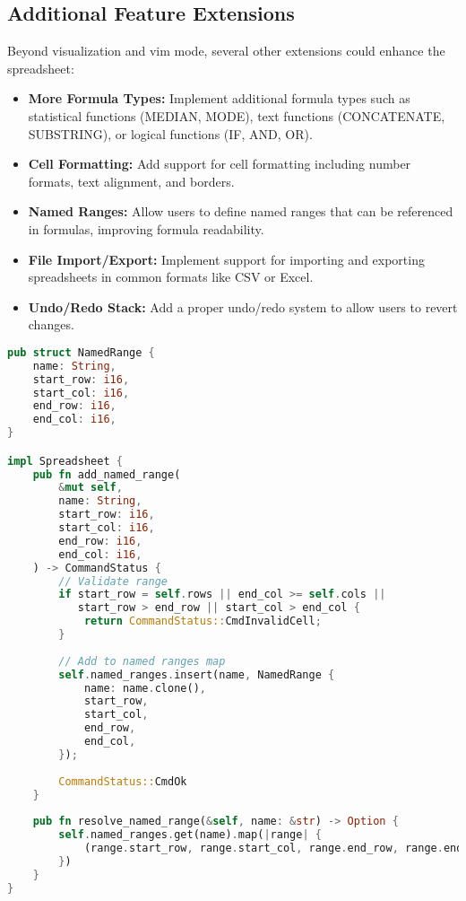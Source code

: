\documentclass[11pt,a4paper]{article}
\begin{document}
\subsection{Additional Feature Extensions}

Beyond visualization and vim mode, several other extensions could enhance the spreadsheet:

\begin{itemize}
  \item \textbf{More Formula Types:} Implement additional formula types such as statistical functions (MEDIAN, MODE), text functions (CONCATENATE, SUBSTRING), or logical functions (IF, AND, OR).
  
  \item \textbf{Cell Formatting:} Add support for cell formatting including number formats, text alignment, and borders.
  
  \item \textbf{Named Ranges:} Allow users to define named ranges that can be referenced in formulas, improving formula readability.
  
  \item \textbf{File Import/Export:} Implement support for importing and exporting spreadsheets in common formats like CSV or Excel.
  
  \item \textbf{Undo/Redo Stack:} Add a proper undo/redo system to allow users to revert changes.
\end{itemize}

\begin{lstlisting}[language=Rust, caption={Implementation of named ranges}, label=lst:named-ranges]
pub struct NamedRange {
    name: String,
    start_row: i16,
    start_col: i16,
    end_row: i16,
    end_col: i16,
}

impl Spreadsheet {
    pub fn add_named_range(
        &mut self,
        name: String,
        start_row: i16,
        start_col: i16,
        end_row: i16,
        end_col: i16,
    ) -> CommandStatus {
        // Validate range
        if start_row = self.rows || end_col >= self.cols ||
           start_row > end_row || start_col > end_col {
            return CommandStatus::CmdInvalidCell;
        }
        
        // Add to named ranges map
        self.named_ranges.insert(name, NamedRange {
            name: name.clone(),
            start_row,
            start_col,
            end_row,
            end_col,
        });
        
        CommandStatus::CmdOk
    }
    
    pub fn resolve_named_range(&self, name: &str) -> Option {
        self.named_ranges.get(name).map(|range| {
            (range.start_row, range.start_col, range.end_row, range.end_col)
        })
    }
}
\end{lstlisting}
\end{document}
